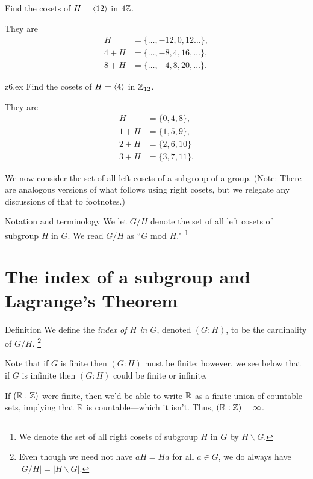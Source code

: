 \begin{example}{} Find the cosets of $H=\langle12\rangle$ in $4\mathbb{Z}$.

They are \begin{align*} H&=\{\ldots, -12,0,12\ldots\},\\ 4+H &=
\{\ldots,-8,4,16,\ldots\},\\ 8+H&=\{\ldots, -4,8,20,\ldots\}.
\end{align*}
\end{example}

\begin{example}{z6.ex} Find the cosets of $H=\langle4\rangle$ in $\mathbb{Z}_{12}$.

They are \begin{align*} H&=\{0,4,8\},\\ 1+H &= \{1,5,9\},\\
2+H&=\{2,6,10\}\\3+H&=\{3,7,11\}.
\end{align*}

\end{example}

 We now consider the set of all left cosets of
a subgroup of a group. (Note: There are analogous versions of
what follows using right cosets, but we relegate any discussions
of that to footnotes.)

\begin{df}{Notation and terminology} We let $G/H$ denote the set of
all left cosets of subgroup $H$ in $G$. We read $G/H$ as ``$G$
mod $H$." \footnote{We denote the set of all right cosets of subgroup $H$ in $G$ by $H\backslash G$.}\end{df}

\section{The index of a subgroup and Lagrange's Theorem}

\begin{df}{Definition} We define the \textit{index of $H$ in $G$}, denoted $(G:H)$,
to be the cardinality of $G/H$. \footnote{Even though we need not have $aH=Ha$ for all $a\in G$, we do always have $|G/H|=|H\backslash G|$.}\end{df}

 Note that if $G$ is finite then $(G:H)$ must be finite; however,
we see below that if $G$ is infinite then $(G:H)$ could be finite or
infinite.

\begin{example}{} If $(\mathbb{R}:\mathbb{Z})$ were finite, then we'd be able to
write $\mathbb{R}$ as a finite union of countable sets, implying that
$\mathbb{R}$ is countable---which it isn't.  Thus, $(\mathbb{R}:\mathbb{Z})=\infty$.
\end{example}

